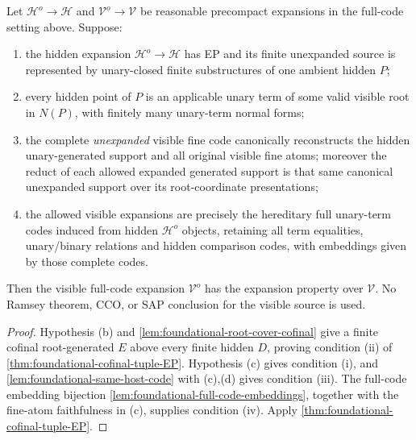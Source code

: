 \begin{corollary}
\label{cor:foundational-root-covered-full-code-EP}
Let $\mathcal H^o\to\mathcal H$ and
$\mathcal V^o\to\mathcal V$ be reasonable precompact expansions in
the full-code setting above. Suppose:
\begin{enumerate}[label=(\alph*),leftmargin=*]
\item the hidden expansion $\mathcal H^o\to\mathcal H$
has EP and its finite unexpanded source is represented
by unary-closed finite substructures of one ambient
hidden $P$;
\item every hidden point of $P$ is an applicable unary
term of some valid visible root in $N(P)$, with finitely
many unary-term normal forms;
\item the complete \emph{unexpanded} visible fine code
canonically reconstructs the hidden unary-generated
support and all original visible fine atoms; moreover the reduct of
each allowed expanded generated support is that same canonical
unexpanded support over its root-coordinate presentations;
\item the allowed visible expansions are precisely
the hereditary full unary-term codes induced from
hidden $\mathcal H^o$ objects, retaining all term
equalities, unary/binary relations and hidden comparison
codes, with embeddings given by those complete codes.
\end{enumerate}
Then the visible full-code expansion $\mathcal V^o$
has the expansion property over $\mathcal V$.
No Ramsey theorem, CCO, or SAP conclusion for the
visible source is used.
\end{corollary}
\begin{proof}
Hypothesis (b) and
\cref{lem:foundational-root-cover-cofinal}
give a finite cofinal root-generated $E$ above
every finite hidden $D$, proving condition (ii)
of \cref{thm:foundational-cofinal-tuple-EP}.
Hypothesis (c) gives condition (i), and
\cref{lem:foundational-same-host-code}
with (c),(d) gives condition (iii).
The full-code embedding bijection
\cref{lem:foundational-full-code-embeddings},
together with the fine-atom faithfulness in
(c), supplies condition (iv). Apply
\cref{thm:foundational-cofinal-tuple-EP}.
\end{proof}
